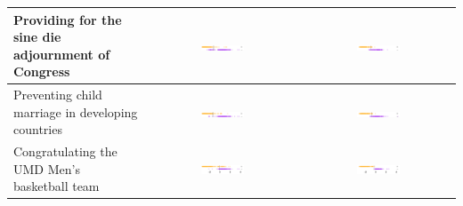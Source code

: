\documentclass{beamer}
\begin{document}
\begin{frame}
\begin{tabular}{|p{3.7cm}|c|c|}
\hline
\small Providing for the sine die adjournment of Congress
& \includegraphics[width=0.3\textwidth]{figs/3397_ideal_point_5.pdf}
& \includegraphics[width=0.3\textwidth]{figs/3397_adjusted_ideal_point_5.pdf} \\
\hline
\small Preventing child marriage in developing countries
& \includegraphics[width=0.3\textwidth]{figs/3397_ideal_point_3.pdf}
& \includegraphics[width=0.3\textwidth]{figs/3397_adjusted_ideal_point_3.pdf} \\
\hline
\small Congratulating the UMD Men's basketball team
& \includegraphics[width=0.3\textwidth]{figs/3397_ideal_point_1.pdf}
& \includegraphics[width=0.3\textwidth]{figs/3397_adjusted_ideal_point_1.pdf} \\
\hline
\end{tabular}

\end{frame}
\end{document}
